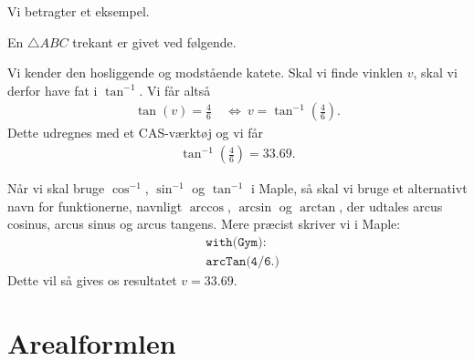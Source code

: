 Vi betragter et eksempel.
\begin{exa}
	En $\triangle ABC$ trekant er givet ved følgende. 
	\begin{center}
	\end{center}
	Vi kender den hosliggende og modstående katete. Skal vi finde vinklen $v$, skal vi derfor have fat i 
	$\tan^{-1}$. Vi får altså
	\begin{align*}
		\tan(v) = \frac{4}{6} \ &\Leftrightarrow \ v = \tan^{-1}\left(\frac{4}{6}\right).
	\end{align*}
	Dette udregnes med et CAS-værktøj og vi får
	\begin{align*}
		\tan^{-1}\left( \frac{4}{6} \right) = 33.69.
	\end{align*}
\end{exa}
Når vi skal bruge $\cos^{-1}$, $\sin^{-1}$ og $\tan^{-1}$ i Maple, så skal vi bruge et alternativt navn for funktionerne, navnligt $\arccos$, $\arcsin$ og $\arctan$, der udtales arcus cosinus, arcus sinus og arcus tangens. Mere præcist skriver vi i Maple:
\begin{align*}
	&\texttt{with(Gym):} \\
	&\texttt{arcTan(4/6.)}
\end{align*}
Dette vil så gives os resultatet $v = 33.69$. 

\section*{Arealformlen}

